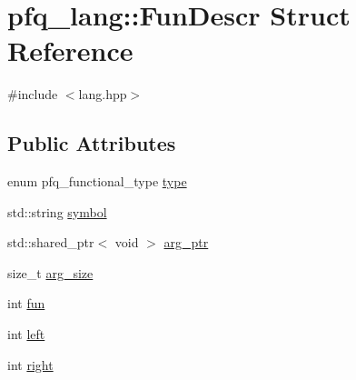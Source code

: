 \hypertarget{structpfq__lang_1_1FunDescr}{\section{pfq\-\_\-lang\-:\-:Fun\-Descr Struct Reference}
\label{structpfq__lang_1_1FunDescr}
}


{\ttfamily \#include $<$lang.\-hpp$>$}

\subsection*{Public Attributes}
\begin{DoxyCompactItemize}
\item 
enum pfq\-\_\-functional\-\_\-type \hyperlink{structpfq__lang_1_1FunDescr_a48a16971f3d255aed8551bc0690913cf}{type}
\item 
std\-::string \hyperlink{structpfq__lang_1_1FunDescr_a7d95e70cba06a41f63bcc960900c83ff}{symbol}
\item 
std\-::shared\-\_\-ptr$<$ void $>$ \hyperlink{structpfq__lang_1_1FunDescr_aa96cb2764befea1e5b8b61927e4a4871}{arg\-\_\-ptr}
\item 
size\-\_\-t \hyperlink{structpfq__lang_1_1FunDescr_a6690de6f15bab43587dadf2f88491ae4}{arg\-\_\-size}
\item 
int \hyperlink{structpfq__lang_1_1FunDescr_a073bf3b9daa315c7498dacd6d4c8266f}{fun}
\item 
int \hyperlink{structpfq__lang_1_1FunDescr_abdd618d54ab1e074a83d698d5a4b8197}{left}
\item 
int \hyperlink{structpfq__lang_1_1FunDescr_afaca33d533c4668acfd5e6aea52026b4}{right}
\end{DoxyCompactItemize}


